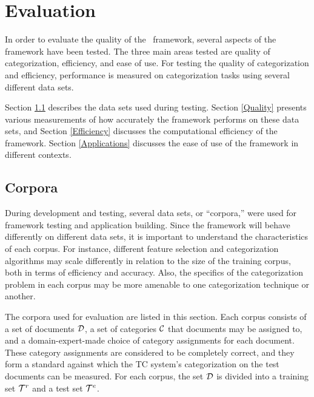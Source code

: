 \chapter{Evaluation}
\label{Evaluation}

In order to evaluate the quality of the \aicat\ framework, several
aspects of the framework have been tested.  The three main areas
tested are quality of categorization, efficiency, and ease of use.
For testing the quality of categorization and efficiency, performance
is measured on categorization tasks using several different data sets.

Section \ref{Corpora} describes the data sets used during testing.
Section \ref{Quality} presents various measurements of how accurately
the framework performs on these data sets, and Section
\ref{Efficiency} discusses the computational efficiency of the
framework.  Section \ref{Applications} discusses the ease of use of
the framework in different contexts.

\section{Corpora}
\label{Corpora}

During development and testing, several data sets, or ``corpora,''
were used for framework testing and application building.  Since the
framework will behave differently on different data sets, it is
important to understand the characteristics of each corpus.  For
instance, different feature selection and categorization algorithms
may scale differently in relation to the size of the training corpus,
both in terms of efficiency and accuracy. \cite{chakrabarti:98} Also,
the specifics of the categorization problem in each corpus may be more
amenable to one categorization technique or another.

The corpora used for evaluation are listed in this section.  Each
corpus consists of a set of documents $\mathcal{D}$, a set of categories $\mathcal{C}$ that
documents may be assigned to, and a domain-expert-made choice of
category assignments for each document.  These category assignments
are considered to be completely correct, and they form a standard
against which the TC system's categorization on the test documents can
be measured.  For each corpus, the set $\mathcal{D}$ is divided into a
training set $\mathcal{T}^r$ and a test set $\mathcal{T}^e$.

